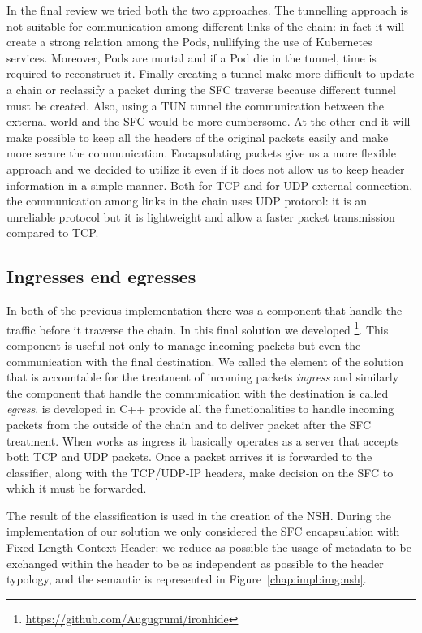 \vspace*{1cm}

\noindent In the final review we tried both the two approaches. The tunnelling
approach is not suitable for communication among different links of the chain:
in fact it will create a strong relation among the Pods, nullifying the use of
Kubernetes services. Moreover, Pods are mortal and if a Pod die in the tunnel,
time is required to reconstruct it. Finally creating a tunnel make more
difficult to update a chain or reclassify a packet during the SFC traverse
because different tunnel must be created. Also, using a TUN tunnel the
communication between the external world and the SFC would be more cumbersome.
At the other end it will make possible to keep all the headers of the original
packets easily and make more secure the communication. Encapsulating packets
give us a more flexible approach and we decided to utilize it even if it does
not allow us to keep header information in a simple manner. Both for TCP and for
UDP external connection, the communication among links in the chain uses UDP
protocol: it is an unreliable protocol but it is lightweight and allow a faster
packet transmission compared to TCP.

\subsection{Ingresses end egresses}
In both of the previous implementation there was a component that handle the
traffic before it traverse the chain. In this final solution we developed 
\ironhide{}\footnote{\url{https://github.com/Augugrumi/ironhide}}. This
component is useful not only to manage incoming packets but even the
communication with the final destination. We called the element of the solution
that is accountable for the treatment of incoming packets \emph{ingress} and
similarly the component that handle the communication with the destination is
called \emph{egress}. \ironhide{} is developed in C++ provide all the
functionalities to handle incoming packets from the outside of the chain and to
deliver packet after the SFC treatment. When \ironhide{} works as ingress it
basically operates as a server that accepts both TCP and UDP packets. Once a
packet arrives it is forwarded to the classifier, along with the TCP/UDP-IP
headers, make decision on the SFC to which it must be forwarded.

The result of the classification is used in the creation of the NSH. During the
implementation of our solution we only considered the SFC encapsulation with
Fixed-Length Context Header: we reduce as possible the usage of metadata to be
exchanged within the header to be as independent as possible to the header
typology, and the semantic is represented in Figure~\ref{chap:impl:img:nsh}.


